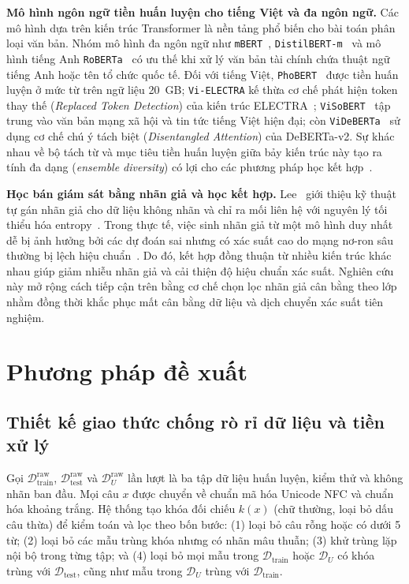 \documentclass[journal,a4paper]{IEEEtran}
\newcommand{\code}[1]{\texttt{\small #1}}
\begin{document}
\textbf{Mô hình ngôn ngữ tiền huấn luyện cho tiếng Việt và đa ngôn ngữ.} Các mô hình dựa trên kiến trúc Transformer là nền tảng phổ biến cho bài toán phân loại văn bản. Nhóm mô hình đa ngôn ngữ như \code{mBERT}~\cite{devlin2019bert}, \code{DistilBERT-m}~\cite{sanh2019distilbert} và mô hình tiếng Anh \code{RoBERTa}~\cite{liu2019roberta} có ưu thế khi xử lý văn bản tài chính chứa thuật ngữ tiếng Anh hoặc tên tổ chức quốc tế. Đối với tiếng Việt, \code{PhoBERT}~\cite{nguyen2020phobert} được tiền huấn luyện ở mức từ trên ngữ liệu 20~GB; \code{Vi-ELECTRA} kế thừa cơ chế phát hiện token thay thế (\textit{Replaced Token Detection}) của kiến trúc ELECTRA~\cite{clark2020electra}; \code{ViSoBERT}~\cite{nguyen2023visobert} tập trung vào văn bản mạng xã hội và tin tức tiếng Việt hiện đại; còn \code{ViDeBERTa}~\cite{tran2023videberta} sử dụng cơ chế chú ý tách biệt (\textit{Disentangled Attention}) của DeBERTa-v2. Sự khác nhau về bộ tách từ và mục tiêu tiền huấn luyện giữa bảy kiến trúc này tạo ra tính đa dạng (\textit{ensemble diversity}) có lợi cho các phương pháp học kết hợp~\cite{dietterich2000ensemble}.

\textbf{Học bán giám sát bằng nhãn giả và học kết hợp.} Lee~\cite{lee2013pseudo} giới thiệu kỹ thuật tự gán nhãn giả cho dữ liệu không nhãn và chỉ ra mối liên hệ với nguyên lý tối thiểu hóa entropy~\cite{grandvalet2004semi}. Trong thực tế, việc sinh nhãn giả từ một mô hình duy nhất dễ bị ảnh hưởng bởi các dự đoán sai nhưng có xác suất cao do mạng nơ-ron sâu thường bị lệch hiệu chuẩn~\cite{guo2017calibration}. Do đó, kết hợp đồng thuận từ nhiều kiến trúc khác nhau giúp giảm nhiễu nhãn giả và cải thiện độ hiệu chuẩn xác suất. Nghiên cứu này mở rộng cách tiếp cận trên bằng cơ chế chọn lọc nhãn giả cân bằng theo lớp nhằm đồng thời khắc phục mất cân bằng dữ liệu và dịch chuyển xác suất tiên nghiệm.

\section{Phương pháp đề xuất}
\label{sec:method}

\subsection{Thiết kế giao thức chống rò rỉ dữ liệu và tiền xử lý}
\label{sec:method_leakage}

Gọi $\mathcal{D}_{\text{train}}^{\text{raw}}$, $\mathcal{D}_{\text{test}}^{\text{raw}}$ và $\mathcal{D}_{U}^{\text{raw}}$ lần lượt là ba tập dữ liệu huấn luyện, kiểm thử và không nhãn ban đầu. Mọi câu $x$ được chuyển về chuẩn mã hóa Unicode NFC và chuẩn hóa khoảng trắng. Hệ thống tạo khóa đối chiếu $k(x)$ (chữ thường, loại bỏ dấu câu thừa) để kiểm toán và lọc theo bốn bước: (1) loại bỏ câu rỗng hoặc có dưới 5 từ; (2) loại bỏ các mẫu trùng khóa nhưng có nhãn mâu thuẫn; (3) khử trùng lặp nội bộ trong từng tập; và (4) loại bỏ mọi mẫu trong $\mathcal{D}_{\text{train}}$ hoặc $\mathcal{D}_{U}$ có khóa trùng với $\mathcal{D}_{\text{test}}$, cũng như mẫu trong $\mathcal{D}_{U}$ trùng với $\mathcal{D}_{\text{train}}$.
\end{document}
